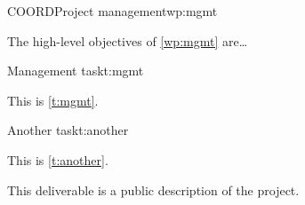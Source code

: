 
\begin{workpackage}{COORD}{Project management}{wp:mgmt}

\makewptable{}

\begin{wpobjectives}
The high-level objectives of \autoref{wp:mgmt} are\dots
\end{wpobjectives}

\begin{wpdescription}

\begin{wptask}{1}{12}{Management task}{t:mgmt}
\makewptaskhead{}

This is \autoref{t:mgmt}.
\end{wptask}

\begin{wptask}{11}{33}{Another task}{t:another}
\makewptaskhead{}

This is \autoref{t:another}. \lipsum
\end{wptask}

\end{wpdescription}


\begin{wpdeliverables}




This deliverable is a public description of the project.


\end{wpdeliverables}

\end{workpackage}
